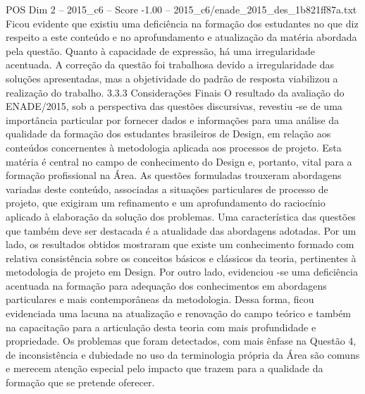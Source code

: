 \begin{textsample}{POS Dim 2 – 2015\_c6 – Score -1.00 – 2015\_c6/enade\_2015\_des\_1b821ff87a.txt}
Ficou evidente que existiu uma deficiência na formação dos estudantes no que diz respeito a este conteúdo e no aprofundamento e atualização da matéria abordada pela questão.
Quanto à capacidade de expressão, há uma irregularidade acentuada.
A correção da questão foi trabalhosa devido a irregularidade das soluções apresentadas, mas a objetividade do padrão de resposta viabilizou a realização do trabalho. 3.3.3 Considerações Finais O resultado da avaliação do ENADE/2015, sob a perspectiva das questões discursivas, revestiu -se de uma importância particular por fornecer dados e informações para uma análise da qualidade da formação dos estudantes brasileiros de Design, em relação aos conteúdos concernentes à metodologia aplicada aos processos de projeto.
Esta matéria é central no campo de conhecimento do Design e, portanto, vital para a formação profissional na Área.
As questões formuladas trouxeram abordagens variadas deste conteúdo, associadas a situações particulares de processo de projeto, que exigiram um refinamento e um aprofundamento do raciocínio aplicado à elaboração da solução dos problemas.
Uma característica das questões que também deve ser destacada é a atualidade das abordagens adotadas.
Por um lado, os resultados obtidos mostraram que existe um conhecimento formado com relativa consistência sobre os conceitos básicos e clássicos da teoria, pertinentes à metodologia de projeto em Design.
Por outro lado, evidenciou -se uma deficiência acentuada na formação para adequação dos conhecimentos em abordagens particulares e mais contemporâneas da metodologia.
Dessa forma, ficou evidenciada uma lacuna na atualização e renovação do campo teórico e também na capacitação para a articulação desta teoria com mais profundidade e propriedade.
Os problemas que foram detectados, com mais ênfase na Questão 4, de inconsistência e dubiedade no uso da terminologia própria da Área são comuns e merecem atenção especial pelo impacto que trazem para a qualidade da formação que se pretende oferecer.

\end{textsample}
